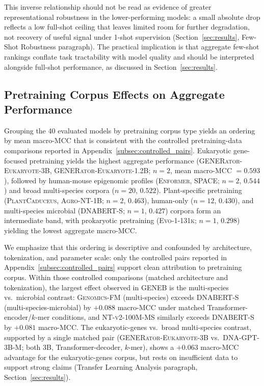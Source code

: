 \documentclass{llmxive}
\begin{document}
This inverse relationship should not be read as evidence of greater
representational robustness in the lower-performing models: a small
absolute drop reflects a low full-shot ceiling that leaves limited
room for further degradation, not recovery of useful signal under
1-shot supervision (Section~\ref{sec:results}, Few-Shot Robustness
paragraph). The practical implication is that aggregate few-shot
rankings conflate task tractability with model quality and should be
interpreted alongside full-shot performance, as discussed in
Section~\ref{sec:results}.

\subsection{Pretraining Corpus Effects on Aggregate Performance}
\label{subsec:pretraining}

Grouping the 40 evaluated models by pretraining corpus type yields
an ordering by mean macro-MCC that is consistent with the controlled
pretraining-data comparisons reported in
Appendix~\ref{subsec:controlled_pairs}. Eukaryotic gene-focused
pretraining yields the highest aggregate performance
(\textsc{GENERator-Eukaryote-3B}, \textsc{GENERator-Eukaryote-1.2B};
$n=2$, mean macro-MCC $= 0.593$), followed by human-mouse epigenomic
profiles (\textsc{Enformer}, \textsc{SPACE}; $n=2$, $0.544$) and
broad multi-species corpora ($n=20$, $0.522$). Plant-specific
pretraining (\textsc{PlantCaduceus}, \textsc{Agro-NT-1B}; $n=2$,
$0.463$), human-only ($n=12$, $0.430$), and multi-species microbial
(\textsc{DNABERT-S}; $n=1$, $0.427$) corpora form an intermediate
band, with prokaryotic pretraining (\textsc{Evo-1-131k}; $n=1$,
$0.298$) yielding the lowest aggregate macro-MCC.

We emphasize that this ordering is descriptive and confounded by
architecture, tokenization, and parameter scale: only the controlled
pairs reported in Appendix~\ref{subsec:controlled_pairs} support
clean attribution to pretraining corpus. Within those controlled
comparisons (matched architecture and tokenization), the largest
effect observed in GENEB is the multi-species vs.\ microbial
contrast: \textsc{Genomics-FM} (multi-species) exceeds
\textsc{DNABERT-S} (multi-species-microbial) by $+0.088$ macro-MCC
under matched Transformer-encoder/$k$-mer conditions, and
\textsc{NT-v2-100M-MS} similarly exceeds \textsc{DNABERT-S} by
$+0.081$ macro-MCC. The eukaryotic-genes vs.\ broad multi-species
contrast, supported by a single matched pair
(\textsc{GENERator-Eukaryote-3B} vs.\ \textsc{DNA-GPT-3B-M}; both 3B,
Transformer-decoder, $k$-mer), shows a $+0.063$ macro-MCC advantage
for the eukaryotic-genes corpus, but rests on insufficient data to
support strong claims (Transfer Learning Analysis paragraph,
Section~\ref{sec:results}).
\end{document}
